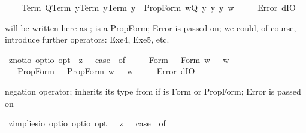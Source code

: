 \begin{isabellebody}
\ \ \ \ {\isacharparenleft}Term\ Q{\isacharcomma}Term\ y{}{\isacharcomma}Term\ y{}{\isacharcomma}Term\ y{}{\isacharparenright}\ {\isasymRightarrow}\ PropForm\ {\isacharparenleft}{\isasymlambda}w{\isachardot}{\isacharparenleft}Q\ y{}\ y{}\ y{}{\isacharparenright}\ w{\isacharparenright}\isanewline
\ \ {\isacharbar}\ {\isacharunderscore}\ {\isasymRightarrow}\ Error\ dIO{\isachardoublequoteclose}%
\begin{isamarkuptext}%
  will be written here as ;  is a PropForm; Error is passed on; 
we could, of course, introduce further operators: Exe4, Exe5, etc.%
\end{isamarkuptext}%
\isamarkuptrue%
\isamarkupfalse%
\ z{\isacharunderscore}not{\isacharcolon}{\isacharcolon}{\isachardoublequoteopen}io\ opt{\isasymRightarrow}io\ opt{\isachardoublequoteclose}\ \ {\isachardoublequoteopen}{\isasymnot}\isactrlsup z\ {\isasymphi}\ {\isasymequiv}\ case\ {\isasymphi}\ of\ \isanewline
\ \ \ \ Form\ {\isasympsi}\ {\isasymRightarrow}\ Form\ {\isacharparenleft}{\isasymlambda}w{\isachardot}\ {\isasymnot}\ {\isasympsi}\ w{\isacharparenright}\isanewline
\ \ {\isacharbar}\ PropForm\ {\isasympsi}\ {\isasymRightarrow}\ PropForm\ {\isacharparenleft}{\isasymlambda}w{\isachardot}\ {\isasymnot}\ {\isasympsi}\ w{\isacharparenright}\isanewline
\ \ {\isacharbar}\ {\isacharunderscore}\ {\isasymRightarrow}\ Error\ dIO{\isachardoublequoteclose}%
\begin{isamarkuptext}%
negation operator;  inherits its type from \isa{{\isasymphi}} if \isa{{\isasymphi}} is Form or PropForm; 
Error is passed on%
\end{isamarkuptext}%
\isamarkuptrue%
\isamarkupfalse%
\ z{\isacharunderscore}implies{\isacharcolon}{\isacharcolon}{\isachardoublequoteopen}io\ opt{\isasymRightarrow}io\ opt{\isasymRightarrow}io\ opt{\isachardoublequoteclose}\ \ {\isachardoublequoteopen}{\isasymphi}\ {\isasymrightarrow}\isactrlsup z\ {\isasympsi}\ {\isasymequiv}\ case\ {\isacharparenleft}{\isasymphi}{\isacharcomma}{\isasympsi}{\isacharparenright}\ of\ \isanewline

\end{isabellebody}
